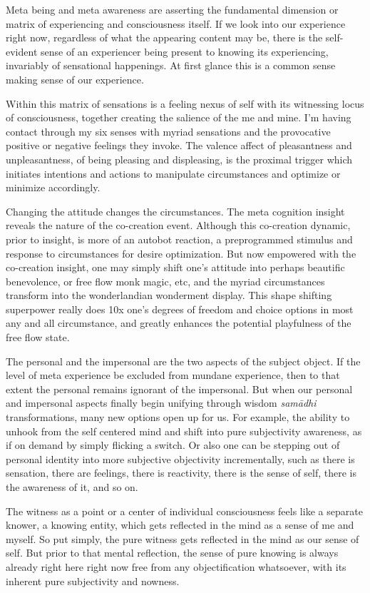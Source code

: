 \documentclass[12pt,openany]{book}
\begin{document}
Meta being and meta awareness are asserting the fundamental dimension or matrix of experiencing and consciousness itself. If we look into our experience right now, regardless of what the appearing content may be, there is the self-evident sense of an experiencer being present to knowing its experiencing, invariably of sensational happenings. At first glance this is a common sense making sense of our experience.

Within this matrix of sensations is a feeling nexus of self with its witnessing locus of consciousness, together creating the \linebreak salience of the me and mine. I'm having contact through my six senses with myriad sensations and the provocative positive or negative feelings they invoke. The valence affect of pleasantness and unpleasantness, of being pleasing and displeasing, is the proximal trigger which initiates intentions and actions to manipulate circumstances and optimize or minimize accordingly.

Changing the attitude changes the circumstances. The meta cognition insight reveals the nature of the co-creation event. Although this co-creation dynamic, prior to insight, is more of an autobot reaction, a preprogrammed stimulus and response to circumstances for desire optimization. But now empowered with the co-creation insight, one may simply shift one's attitude into perhaps beautific benevolence, or free flow monk magic, etc, and the myriad circumstances transform into the wonderlandian wonderment display. This shape shifting superpower really does 10x one's degrees of freedom and choice options in most any and all circumstance, and greatly enhances the potential playfulness of the free flow state.

The personal and the impersonal are the two aspects of the subject object. If the level of meta experience be excluded from mundane experience, then to that extent the personal remains ignorant of the impersonal. But when our personal and impersonal aspects finally begin unifying through wisdom \textit{samādhi} transformations, many new options open up for us. For example, the ability to unhook from the self centered mind and shift into pure subjectivity awareness, as if on demand by simply flicking a switch. Or also one can be stepping out of personal identity into more subjective objectivity incrementally, such as there is sensation, there are feelings, there is reactivity, there is the sense of self, there is the awareness of it, and so on.

The witness as a point or a center of individual consciousness feels like a separate knower, a knowing entity, which gets reflected in the mind as a sense of me and myself. So put simply, the pure witness gets reflected in the mind as our sense of self. But prior to that mental reflection, the sense of pure knowing is always already right here right now free from any objectification whatsoever, with its inherent pure subjectivity and nowness.
\end{document}
